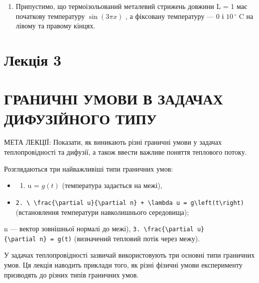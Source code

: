 \documentclass[
]{article}
\providecommand{\tightlist}{%
  \setlength{\itemsep}{0pt}\setlength{\parskip}{0pt}}
\begin{document}
\begin{enumerate}
\def\labelenumi{\arabic{enumi}.}
\setcounter{enumi}{3}
\tightlist
\item
  Припустимо, що термоізольований металевий стрижень довжини L = 1 має
  початкову температуру \(\sin(3\pi x)\) , а фіксовану температуру --- 0
  і \(10\,^{\circ}\) C на лівому та правому кінцях.
\end{enumerate}

\section{Лекція 3}\label{ux43bux435ux43aux446ux456ux44f-3}

\section{ГРАНИЧНІ УМОВИ В ЗАДАЧАХ ДИФУЗІЙНОГО
ТИПУ}\label{ux433ux440ux430ux43dux438ux447ux43dux456-ux443ux43cux43eux432ux438-ux432-ux437ux430ux434ux430ux447ux430ux445-ux434ux438ux444ux443ux437ux456ux439ux43dux43eux433ux43e-ux442ux438ux43fux443}

МЕТА ЛЕКЦІЇ: Показати, як виникають різні граничні умови у задачах
теплопровідності та дифузії, а також ввести важливе поняття теплового
потоку.

Розглядаються три найважливіші типи граничних умов:

\begin{itemize}
\tightlist
\item
  \begin{enumerate}
  \def\labelenumi{\arabic{enumi}.}
  \tightlist
  \item
    u = \(g(t)\) (температура задається на межі),
  \end{enumerate}
\item
  \texttt{2.\ \textbackslash{}\ \textbackslash{}frac\{\textbackslash{}partial\ u\}\{\textbackslash{}partial\ n\}\ +\ \textbackslash{}lambda\ u\ =\ g\textbackslash{}left(t\textbackslash{}right)}
  (встановлення температури навколишнього середовища);
\end{itemize}

n --- вектор зовнішньої нормалі до межі),
\texttt{3.\ \textbackslash{}frac\{\textbackslash{}partial\ u\}\{\textbackslash{}partial\ n\}\ =\ g(t)}
(визначений тепловий потік через межу).

У задачах теплопровідності зазвичай використовують три основні типи
граничних умов. Ця лекція наводить приклади того, як різні фізичні умови
експерименту призводять до різних типів граничних умов.
\end{document}

